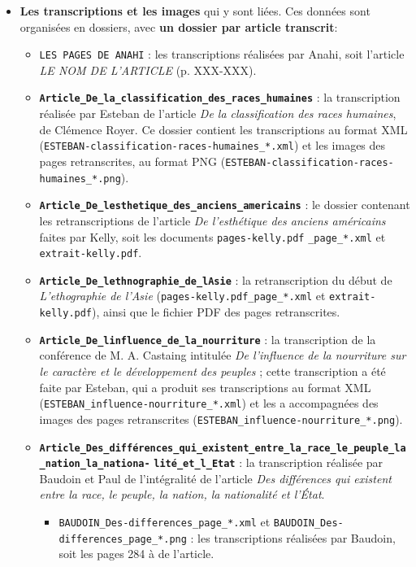 \documentclass{article}
\begin{document}
	\begin{itemize}
		\item \textbf{Les transcriptions et les images} qui y sont liées. Ces données sont organisées en dossiers, avec \textbf{un dossier par article transcrit}:
		\begin{itemize}
			\item \texttt{LES PAGES DE ANAHI} : les transcriptions réalisées par Anahi, soit l'article \textit{LE NOM DE L'ARTICLE} (p. XXX-XXX).
			\item \textbf{\texttt{Article\_De\_la\_classification\_des\_races\_humaines}} : la transcription réalisée par Esteban de l'article \textit{De la classification des races humaines}, de Clémence Royer. Ce dossier contient les transcriptions au format XML (\texttt{ESTEBAN-classification-races-humaines\_*.xml}) et les images des pages retranscrites, au format PNG (\texttt{ESTEBAN-classification-races-humaines\_*.png}).
			\item \textbf{\texttt{Article\_De\_lesthetique\_des\_anciens\_americains}} : le dossier contenant les retranscriptions de l'article \textit{De l'esthétique des anciens américains} faites par Kelly, soit les documents \texttt{pages-kelly.pdf}
			\noindent \texttt{\_page\_*.xml} et \texttt{extrait-kelly.pdf}.
			\item \textbf{\texttt{Article\_De\_lethnographie\_de\_lAsie}} : la retranscription du début de \textit{L'ethographie de l'Asie} (\texttt{pages-kelly.pdf\_page\_*.xml} et \texttt{extrait-kelly.pdf}), ainsi que le fichier PDF des pages retranscrites.
			\item \textbf{\texttt{Article\_De\_linfluence\_de\_la\_nourriture}} : la transcription de la conférence de M. A. Castaing intitulée \textit{De l'influence de la nourriture sur le caractère et le développement des peuples} ; cette transcription a été faite par Esteban, qui a produit ses transcriptions au format XML (\texttt{ESTEBAN\_influence-nourriture\_*.xml}) et les a accompagnées des images des pages retranscrites (\texttt{ESTEBAN\_influence-nourriture\_*.png}).
			\item \textbf{\texttt{Article\_Des\_différences\_qui\_existent\_entre\_la\_race\_le\_peuple\_la\_nation\_la\_nationa-}}
			\noindent \textbf{\texttt{lité\_et\_l\_Etat}} : la transcription réalisée par Baudoin et Paul de l'intégralité de l'article \textit{Des différences qui existent entre la race, le peuple, la nation, la nationalité et l'État}.
			\begin{itemize}
				\item \texttt{BAUDOIN\_Des-differences\_page\_*.xml} et \texttt{BAUDOIN\_Des-differences\_page\_*.png} : les transcriptions réalisées par Baudoin, soit les pages 284 à de l'article.

\end{itemize}
\end{itemize}
\end{itemize}
\end{document}
